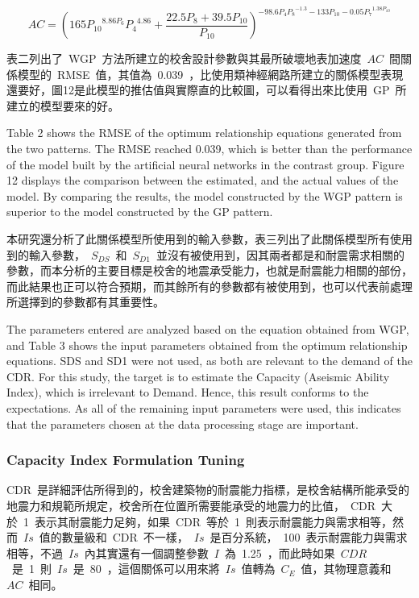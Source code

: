 \begin{equation} AC = {({165 P_{10}}^{8.86 P_6} {P_4}^{4.86} + \dfrac{22.5 P_8 + 39.5 P_{10}}{P_{10}} )}^{-98.6 P_4{P_8}^{-1.3} - 133 P_{10} - 0.05 {P_7}^{1.38 P_{10}} }  \label{eq:WGP_AC}\end{equation}

表二列出了~WGP~方法所建立的校舍設計參數與其最所破壞地表加速度~$AC$~間關係模型的~RMSE~值，其值為~0.039~，比使用類神經網路所建立的關係模型表現還要好，圖12是此模型的推估值與實際直的比較圖，可以看得出來比使用~GP~所建立的模型要來的好。

Table 2 shows the RMSE of the optimum relationship equations generated from the two patterns. The RMSE reached 0.039, which is better than the performance of the model built by the artificial neural networks in the contrast group. Figure 12 displays the comparison between the estimated, and the actual values of the model. By comparing the results, the model constructed by the WGP pattern is superior to the model constructed by the GP pattern.

本研究還分析了此關係模型所使用到的輸入參數，表三列出了此關係模型所有使用到的輸入參數，~$S_{DS}$~和~$S_{D1}$~並沒有被使用到，因其兩者都是和耐震需求相關的參數，而本分析的主要目標是校舍的地震承受能力，也就是耐震能力相關的部份，而此結果也正可以符合預期，而其餘所有的參數都有被使用到，也可以代表前處理所選擇到的參數都有其重要性。

The parameters entered are analyzed based on the equation obtained from WGP, and Table 3 shows the input parameters obtained from the optimum relationship equations. SDS and SD1 were not used, as both are relevant to the demand of the CDR. For this study, the target is to estimate the Capacity (Aseismic Ability Index), which is irrelevant to Demand. Hence, this result conforms to the expectations. As all of the remaining input parameters were used, this indicates that the parameters chosen at the data processing stage are important.

\subsubsection{Capacity Index Formulation Tuning}

CDR~是詳細評估所得到的，校舍建築物的耐震能力指標，是校舍結構所能承受的地震力和規範所規定，校舍所在位置所需要能承受的地震力的比值，~CDR~大於~1~表示其耐震能力足夠，如果~CDR~等於~1~則表示耐震能力與需求相等，然而~$Is$~值的數量級和~CDR~不一樣，~$Is$~是百分系統，~100~表示耐震能力與需求相等，不過~$Is$~內其實還有一個調整參數~$I$~為~1.25~，而此時如果~$CDR$~是~1~則~$Is$~是~80~，這個關係可以用來將~$Is$~值轉為~$C_E$~值，其物理意義和~$AC$~相同。

